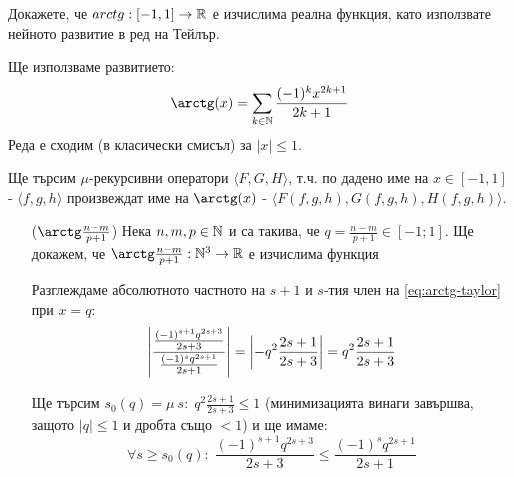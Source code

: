 \begin{problem}
Докажете, че $arctg : [-1, 1] \to {\mathbb{R}}$ е изчислима реална функция, като използвате нейното развитие в ред на Тейлър.
\end{problem}
\begin{solution}
    Ще използваме развитието:
    \begin{equation}\label{eq:arctg-taylor}
        \arctg(x) = \sum_{k\in\N} \frac{(-1)^k x^{2k+1}}{2k+1}
    \end{equation}
    Реда е сходим (в класически смисъл) за $|x| \leq 1$.

    Ще търсим $\mu$-рекурсивни оператори $\langle F, G, H \rangle$, т.ч. по дадено име на $x \in [-1, 1]$ - $\langle f, g, h\rangle$ произвеждат име на $\arctg(x)$ - $\langle F(f, g, h), G(f, g, h), H(f, g, h)\rangle$.

    \begin{itemize}
        \item[($\arctg\frac{n - m}{p+1}$)] Нека $n,m,p \in {\mathbb{N}}$ и са такива, че $q = \frac{n - m}{p+1} \in [-1; 1]$. Ще докажем, че $\arctg\frac{n - m}{p+1} : \N^3 \to \R$ е изчислима функция

            Разглеждаме абсолютното частното на $s+1$ и $s$-тия член на \eqref{eq:arctg-taylor} при $x = q$:
            \begin{equation}
                \left|\frac{\frac{(-1)^{s+1} q^{2s+3}}{2s+3}}{\frac{(-1)^s q^{2s+1}}{2s+1}}\right| = \left|- q^2 \frac{2s+1}{2s + 3}\right| = q^2 \frac{2s+1}{2s + 3}
            \end{equation}

            Ще търсим $s_0(q) = \mu\ s:\; q^2 \frac{2s+1}{2s+3} \leq 1$ (минимизацията винаги завършва, защото $|q| \leq 1$ и дробта също $<1$) и ще имаме:
            \begin{equation}
                \forall s \geq s_0(q):\; \frac{(-1)^{s+1} q^{2s+3}}{2s+3} \leq \frac{(-1)^s q^{2s+1}}{2s+1}
            \end{equation}


\end{itemize}
\end{solution}
